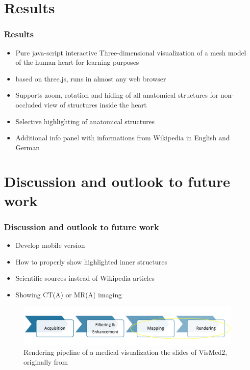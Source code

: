 \documentclass{beamer}
\begin{document}
\section{Results} 
\begin{frame}
\frametitle{Results}
\begin{itemize}
\item Pure java-script interactive Three-dimensional visualization of a mesh model of the human heart for learning purposes
\item based on three.js, runs in almost any web browser
\item Supports zoom, rotation and hiding of all anatomical structures for non-occluded view of structures inside the heart
\item Selective highlighting of anatomical structures
\item Additional info panel with informations from Wikipedia in English and German
\end{itemize}
\end{frame}

\section{Discussion and outlook to future work} 
\begin{frame}
\frametitle{Discussion and outlook to future work}
\begin{itemize}
\item Develop mobile version
\item How to properly show highlighted inner structures 
\item Scientific sources instead of Wikipedia articles
\item Showing CT(A) or MR(A) imaging

\end{itemize}

\begin{figure}[h]
  \centering
  \includegraphics[width=.4\linewidth]{../../screenshots/images/renderingpipieline.png}
  \caption{Rendering pipeline of a medical visualization the slides of VisMed2, originally from \cite{p2}}
\end{figure}



\end{frame}
\end{document}
